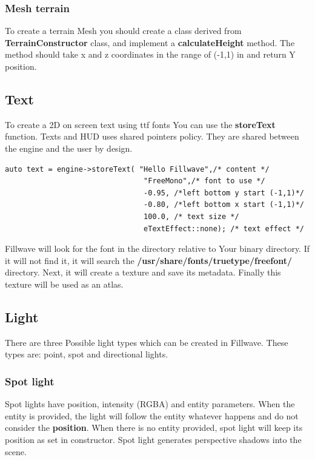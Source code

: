 \documentclass{article}
\begin{document}
\subsubsection{Mesh terrain}\label{sec:MeshTerrain}
\indent \indent To create a terrain Mesh you should create a class derived from \textbf{TerrainConstructor} class, and implement a \textbf{calculateHeight} method. The method should take x and z coordinates in the range of (-1,1) in and return Y position.

\subsection{Text}\label{sec:Text}
\indent \indent To create a 2D on screen text using ttf fonts You can use the \textbf{storeText} function. Texts and HUD uses shared pointers policy. They are shared between the engine and the user by design.

\begin{lstlisting}
auto text = engine->storeText( "Hello Fillwave",/* content */
                                "FreeMono",/* font to use */
                                -0.95, /*left bottom y start (-1,1)*/    
                                -0.80, /*left bottom x start (-1,1)*/     
                                100.0, /* text size */
                                eTextEffect::none); /* text effect */
\end{lstlisting}

\indent \indent Fillwave will look for the font in the directory relative to Your binary directory. If it will not find it, it will search the \textbf{/usr/share/fonts/truetype/freefont/} directory. Next, it will create a texture and save its metadata. Finally this texture will be used as an atlas.

\subsection{Light}\label{sec:Light}
\indent \indent There are three Possible light types which can be created in Fillwave. These types are: point, spot and directional lights.


\subsubsection{Spot light}\label{sec:Spot light}
\indent \indent Spot lights have position, intensity (RGBA) and entity parameters. When the entity is provided, the light will follow the entity whatever happens and do not consider the \textbf{position}. When there is no entity provided, spot light will keep its position as set in constructor. Spot light generates perspective shadows into the scene.
\end{document}
